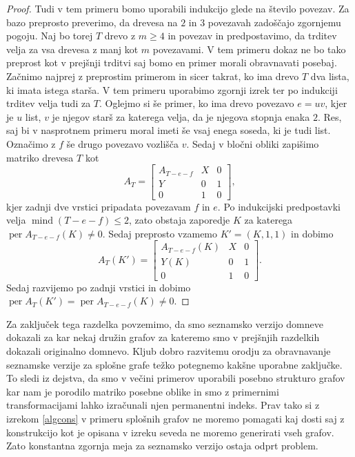 \documentclass[12pt,a4paper,twoside]{article}
\theoremstyle{definition} %
\theoremstyle{plain} %
\numberwithin{equation}{section}  %
\DeclareMathOperator{\per}{per}
\DeclareMathOperator{\mind}{mind}
\begin{document}
\begin{proof}
Tudi v tem primeru bomo uporabili indukcijo glede na število povezav. Za bazo preprosto preverimo, da drevesa na $2$ in $3$ povezavah zadoščajo zgornjemu pogoju. Naj bo torej $T$ drevo z $m \ge 4$ in povezav in predpostavimo, da trditev velja za vsa drevesa z manj kot $m$ povezavami. V tem primeru dokaz ne bo tako preprost kot v prejšnji trditvi saj bomo en primer morali obravnavati posebaj. Začnimo najprej z preprostim primerom in sicer takrat, ko ima drevo $T$ dva lista, ki imata istega starša. V tem primeru uporabimo zgornji izrek ter po indukciji trditev velja tudi za $T$. Oglejmo si še primer, ko ima drevo povezavo $e=uv$, kjer je $u$ list, $v$ je njegov starš za katerega velja, da je njegova stopnja enaka $2$. Res, saj bi v nasprotnem primeru moral imeti še vsaj enega soseda, ki je tudi list. Označimo z $f$ še drugo povezavo vozlišča $v$. Sedaj v bločni obliki zapišimo matriko drevesa $T$ kot
$$ A_T = \left[ \begin{matrix}
 A_{T-e-f}& X & 0 \\
 Y & 0 & 1 \\
0 & 1 & 0 
\end{matrix} \right] ,$$
kjer zadnji dve vrstici pripadata povezavam $f$ in $e$. Po indukcijski predpostavki velja $\mind(T-e-f) \le 2$, zato obstaja zaporedje $K$ za katerega $\per A_{T-e-f}(K) \neq0$. Sedaj preprosto vzamemo $K' = (K, 1, 1)$ in dobimo
$$ A_T(K') = \left[ \begin{matrix}
 A_{T-e-f}(K)& X & 0 \\
 Y(K) & 0 & 1 \\
0 & 1 & 0 
\end{matrix} \right] .$$
Sedaj razvijemo po zadnji vrstici in dobimo $\per A_T(K') = \per  A_{T-e-f}(K) \neq 0$.
 \end{proof}

Za zaključek tega razdelka povzemimo, da smo seznamsko verzijo domneve dokazali za kar nekaj družin grafov za kateremo smo v prejšnjih razdelkih dokazali originalno domnevo. Kljub dobro razvitemu orodju za obravnavanje seznamske verzije za splošne grafe težko potegnemo kakšne uporabne zaključke. To sledi iz dejstva, da smo v večini primerov uporabili posebno strukturo grafov kar nam je porodilo matriko posebne oblike in smo z primernimi transformacijami lahko izračunali njen permanentni indeks. Prav tako si z izrekom \ref{algcons} v primeru splošnih grafov ne moremo pomagati kaj dosti saj z konstrukcijo kot je opisana v izreku seveda ne moremo generirati vseh grafov. Zato konstantna zgornja meja za seznamsko verzijo ostaja odprt problem.
\end{document}
